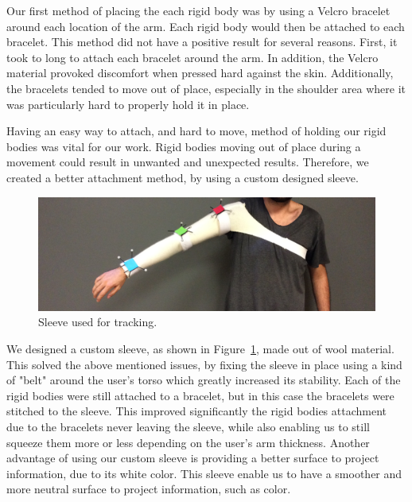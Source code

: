 Our first method of placing the each rigid body was by using a Velcro bracelet around each location of the arm. 
Each rigid body would then be attached to each bracelet. This method did not have a positive result for several reasons. 
First, it took to long to attach each bracelet around the arm. In addition, the Velcro material provoked discomfort when pressed hard against the skin. 
Additionally, the bracelets tended to move out of place, especially in the shoulder area where it was particularly hard to properly hold it in place.

Having an easy way to attach, and hard to move, method of holding our rigid bodies was vital for our work. 
Rigid bodies moving out of place during a movement could result in unwanted and unexpected results. 
Therefore, we created a better attachment method, by using a custom designed sleeve.


\begin{figure}[!t]
    \begin{center}
        \includegraphics[width=\textwidth]{imgs/impl/sleevewearable}
    \end{center}
    \caption{Sleeve used for tracking.}
    \label{fig:sleevewearable}
\end{figure}

We designed a custom sleeve, as shown in Figure~\ref{fig:sleevewearable}, made out of wool material. 
This solved the above mentioned issues, by fixing the sleeve in place using a kind of "belt" around the user's torso which greatly increased its stability. 
Each of the rigid bodies were still attached to a bracelet, but in this case the bracelets were stitched to the sleeve. 
This improved significantly the rigid bodies attachment due to the bracelets never leaving the sleeve, 
while also enabling us to still squeeze them more or less depending on the user's arm thickness.
Another advantage of using our custom sleeve is providing a better surface to project information, due to its white color. This sleeve enable us to have a smoother and more neutral surface to project information, such as color.  

